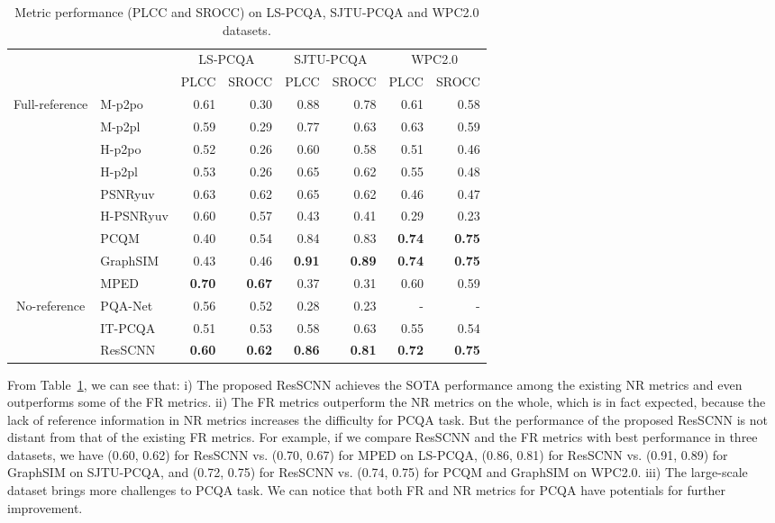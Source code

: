 \documentclass[acmsmall]{acmart}
\begin{document}
\begin{table}[htbp]
  \centering
  \caption{Metric performance (PLCC and SROCC) on LS-PCQA, SJTU-PCQA and WPC2.0 datasets.}
  \begin{footnotesize}
    \begin{tabular}{c|l|rr|rr|rr}
    \hline
    \multicolumn{2}{c|}{\multirow{2}[4]{*}{}} & \multicolumn{2}{c|}{LS-PCQA} & \multicolumn{2}{c|}{SJTU-PCQA} & \multicolumn{2}{c}{WPC2.0} \\
\cline{3-8}    \multicolumn{2}{c|}{} & \multicolumn{1}{l}{PLCC} & \multicolumn{1}{l|}{SROCC} & \multicolumn{1}{l}{PLCC} & \multicolumn{1}{l|}{SROCC} & \multicolumn{1}{l}{PLCC} & \multicolumn{1}{l}{SROCC} \\
    \hline
    \multirow{9}[2]{*}{Full-reference} & M-p2po & 0.61&0.30&0.88&0.78&0.61&0.58  \\
        &M-p2pl & 0.59&0.29&0.77&0.63&0.63&0.59  \\
        &H-p2po & 0.52&0.26&0.60&0.58&0.51&0.46  \\
        &H-p2pl & 0.53&0.26&0.65&0.62&0.55&0.48  \\
        &PSNRyuv & 0.63&0.62&0.65&0.62&0.46&0.47  \\
        &H-PSNRyuv & 0.60&0.57&0.43&0.41&0.29&0.23  \\
        &PCQM&0.40&0.54&0.84&0.83&\textbf{0.74} & \textbf{0.75} \\
        &GraphSIM & 0.43&0.46&\textbf{0.91} & \textbf{0.89} & \textbf{0.74} & \textbf{0.75} \\
        &MPED&\textbf{0.70} & \textbf{0.67} &0.37&0.31&0.60&0.59  \\
    \hline
    \multirow{3}[2]{*}{No-reference}
     & PQA-Net &0.56 &0.52 &0.28 &0.23 & - & -  \\
      & IT-PCQA &0.51&0.53&0.58&0.63&0.55&0.54  \\
        &ResSCNN & \textbf{0.60} & \textbf{0.62} & \textbf{0.86} & \textbf{0.81} & \textbf{0.72} & \textbf{0.75} \\
    \hline
    \end{tabular}\end{footnotesize}
  \label{comparedwithothers}\end{table}




\par From Table~\ref{comparedwithothers}, we can see that: i) The proposed ResSCNN achieves the SOTA performance among the existing NR metrics and even outperforms some of the FR metrics. ii) The FR metrics outperform the NR metrics on the whole, which is in fact expected, because the lack of reference information in NR metrics increases the difficulty for PCQA task. But the performance of the proposed ResSCNN is not distant from that of the existing FR metrics. For example, if we compare ResSCNN and the FR metrics with best performance in three datasets, we have (0.60, 0.62) for ResSCNN vs. (0.70, 0.67) for MPED on LS-PCQA, (0.86, 0.81) for ResSCNN vs. (0.91, 0.89) for GraphSIM on SJTU-PCQA, and (0.72, 0.75) for ResSCNN vs. (0.74, 0.75) for PCQM and GraphSIM on WPC2.0. iii) The large-scale dataset brings more challenges to PCQA task. We can notice that both FR and NR metrics for PCQA have potentials for further improvement.
\end{document}
